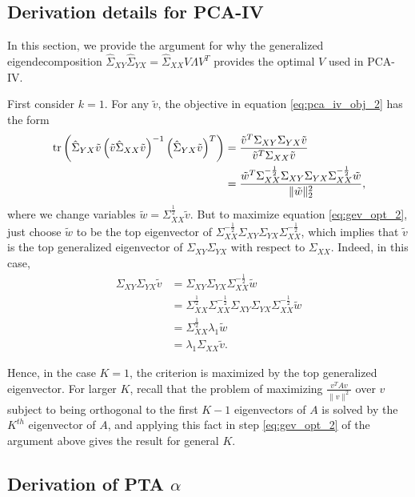 \documentclass{article}
\begin{document}
\subsection{Derivation details for PCA-IV}
\label{subsec:pca_iv_derivation}

In this section, we provide the argument for why the generalized
eigendecomposition $\hat{\Sigma}_{XY}\hat{\Sigma}_{YX} =
\hat{\Sigma}_{XX}V\Lambda V^{T}$ provides the optimal $V$ used in PCA-IV.

First consider $k = 1$. For any $\tilde{v}$, the objective
in equation \ref{eq:pca_iv_obj_2} has the form
\begin{align}
  \mathop\mathrm{tr}\left(\hat{\Sigma}_{YX}\tilde{v}\left(\tilde{v}\hat{\Sigma}_{XX}\tilde{v}\right)^{-1}
  \left(\hat{\Sigma}_{YX}\tilde{v}\right)^{T}\right) &=
  \frac{\tilde{v}^{T}\Sigma_{XY}\Sigma_{YX}\tilde{v}}{\tilde{v}^{T}\Sigma_{XX}\tilde{v}} \nonumber \\
  &= \frac{\tilde{w}^{T}\Sigma_{XX}^{-\frac{1}{2}}\Sigma_{XY}\Sigma_{YX}\Sigma_{XX}^{-\frac{1}{2}}\tilde{w}}{\|\tilde{w}\|_{2}^{2}}, \label{eq:gev_opt_2}
\end{align}
where we change variables $\tilde{w} = \Sigma_{XX}^{\frac{1}{2}}\tilde{v}$. But
to maximize equation \ref{eq:gev_opt_2}, just choose $\tilde{w}$ to be the top
eigenvector of
$\Sigma_{XX}^{-\frac{1}{2}}\Sigma_{XY}\Sigma_{YX}\Sigma_{XX}^{-\frac{1}{2}}$,
which implies that $\tilde{v}$ is the top generalized eigenvector of
$\Sigma_{XY}\Sigma_{YX}$ with respect to $\Sigma_{XX}$. Indeed, in this case,
\begin{align*}
  \Sigma_{XY}\Sigma_{YX}\tilde{v}
  &=\Sigma_{XY}\Sigma_{YX}\Sigma_{XX}^{-\frac{1}{2}}\tilde{w} \\
  &= \Sigma_{XX}^{\frac{1}{2}} \Sigma_{XX}^{-\frac{1}{2}}\Sigma_{XY}\Sigma_{YX} \Sigma_{XX}^{-\frac{1}{2}}\tilde{w}\\
  &= \Sigma_{XX}^{\frac{1}{2}}\lambda_{1}\tilde{w} \\
  &= \lambda_{1}\Sigma_{XX}\tilde{v}.
\end{align*}

Hence, in the case $K = 1$, the criterion is maximized by the top generalized
eigenvector. For larger $K$, recall that the problem of maximizing
$\frac{v^{T}Av}{\|v\|^{2}}$ over $v$ subject to being orthogonal to the first $K
- 1$ eigenvectors of $A$ is solved by the $K^{th}$ eigenvector of $A$, and
applying this fact in step \ref{eq:gev_opt_2} of the argument above gives the
result for general $K$.

\subsection{Derivation of PTA $\alpha$}
\label{subsec:pta_alpha_derivation}
\end{document}
